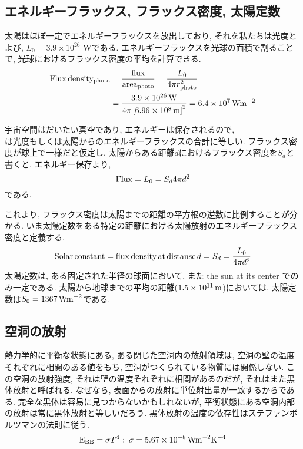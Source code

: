 \documentclass[a4j,12pt,openbib,oneside,dvipdfmx]{jbook}
\begin{document}
\subsection{エネルギーフラックス, フラックス密度, 太陽定数}
\par
太陽はほぼ一定でエネルギーフラックスを放出しており, それを私たちは光度とよび, $L_0=3.9\times10^{26}$ Wである.
エネルギーフラックスを光球の面積で割ることで, 光球におけるフラックス密度の平均を計算できる. 
\begin{align}
  \rm{Flux\, density_{photo}}&=\frac{\rm{flux}}{\rm{area_{photo}}}=\frac{L_0}{4\pi{r^2_{\rm{photo}}}} \nonumber \\
  &=\frac{3.9\times10^{26}\,\rm{W}}{4\pi\left[6.96\times10^8\,\rm{m}\right]^2}=6.4\times10^7\,\rm{Wm^{-2}}
\end{align}
\par
宇宙空間はだいたい真空であり, エネルギーは保存されるので, \\
は光度もしくは太陽からのエネルギーフラックスの合計に等しい. フラックス密度が球上で一様だと仮定し, 太陽からある距離$d$におけるフラックス密度を$S_d$と書くと, エネルギー保存より,
\begin{equation}
  {\rm{Flux}}={L_0}={S_d}4\pi{d^2}
\end{equation}
である.
\par
これより, フラックス密度は太陽までの距離の平方根の逆数に比例することが分かる. いま太陽定数をある特定の距離における太陽放射のエネルギーフラックス密度と定義する.
\begin{equation}
  {\rm{Solar}}\,{\rm{constant}}={\rm{flux}}\,{\rm{density}}\,{\rm{at}}\,{\rm{distanse}}\, d=S_d=\frac{L_0}{4\pi{d^2}}
\end{equation}
太陽定数は, ある固定された半径の球面において, また the sun at its center でのみ一定である. 太陽から地球までの平均の距離($1.5\times10^{11}\,\rm{m}$)においては, 太陽定数は$S_0=1367\,\rm{Wm}^{-2}$である.

\subsection{空洞の放射}
\par
熱力学的に平衡な状態にある, ある閉じた空洞内の放射領域は, 空洞の壁の温度それぞれに相関のある値をもち, 空洞がつくられている物質には関係しない. 
この空洞の放射強度, それは壁の温度それぞれに相関があるのだが, それはまた黒体放射と呼ばれる. なぜなら, 表面からの放射に単位射出量が一致するからである. 
完全な黒体は容易に見つからないかもしれないが, 平衡状態にある空洞内部の放射は常に黒体放射と等しいだろう. 
黒体放射の温度の依存性はステファンボルツマンの法則に従う.
\begin{equation}
  {\rm{E_{BB}}}=\sigma{T^4}\,\,;\,\,\sigma=5.67\times10^{-8}\,\rm{Wm}^{-2}\rm{K}^{-4}
\end{equation}
\end{document}
